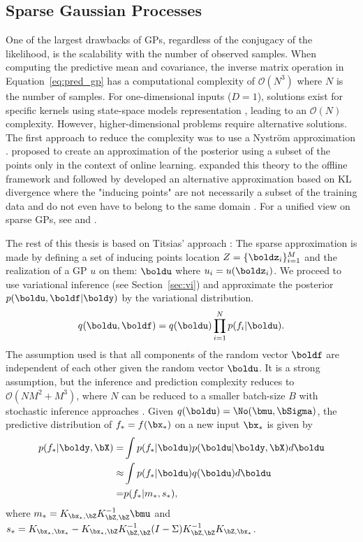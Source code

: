 \subsection{Sparse Gaussian Processes}
\label{sec:sparsegps}
One of the largest drawbacks of \ac{GPs}, regardless of the conjugacy of the likelihood, is the scalability with the number of observed samples.
When computing the predictive mean and covariance, the inverse matrix operation in Equation~\eqref{eq:pred_gp} has a computational complexity of $\mathcal{O}(N^3)$ where $N$ is the number of samples.
For one-dimensional inputs ($D=1$), solutions exist for specific kernels using state-space models representation \cite{pmlr-v9-turner10a,solinInfiniteHorizonGaussianProcesses2018}, leading to an $\mathcal{O}(N)$ complexity.
However, higher-dimensional problems require alternative solutions.
The first approach to reduce the complexity was to use a Nystr\"om approximation \cite{williams2002observations}.
\citet{csato2002sparse} proposed to create an approximation of the posterior using a subset of the points only in the context of online learning.
\citet{snelsonSparseGaussianProcesses2009} expanded this theory to the offline framework and \citet{csato2002gaussian} followed by \citet{Titsias2009} developed an alternative approximation based on KL divergence where the "inducing points" are not necessarily a subset of the training data and do not even have to belong to the same domain \cite{NIPS2009_5ea1649a, vdw2020framework}.
For a unified view on sparse \ac{GPs}, see \citet{quinonero2005unifying} and \citet{bui2017unifying}.

The rest of this thesis is based on Titsias' approach \cite{Titsias2009}:
The sparse approximation is made by defining a set of inducing points location $Z=\{\boldz_i\}_{i=1}^M$ and the realization of a \ac{GP} $u$ on them: $\boldu$ where $u_i = u(\boldz_i)$.
We proceed to use variational inference (see Section~\ref{sec:vi}) and approximate the posterior $p(\boldu,\boldf|\boldy)$ by the variational distribution.
\begin{align}
    q(\boldu,\boldf) = q(\boldu)\prod_{i=1}^N p(f_i|\boldu).
    \label{eq:titsias_assumption}
\end{align}
The assumption used is that all components of the random vector $\boldf$ are independent of each other given the random vector $\boldu$.
It is a strong assumption, but the inference and prediction complexity reduces to $\mathcal{O}(NM^2 + M^3)$, where $N$ can be reduced to a smaller batch-size $B$ with stochastic inference approaches \cite{Hensman2013, Hensman2015}.
Given $q(\boldu) = \No(\bmu,\bSigma)$, the predictive distribution of $f_*=f(\bx_*)$ on a new input $\bx_*$ is given by
\begin{align*}
    p(f_*|\boldy,\bX) =& \int p(f_*|\boldu) p(\boldu|\boldy,\bX)d\boldu\\
    \approx& \int p(f_*|\boldu) q(\boldu)d\boldu\\
    =& p(f_*|m_*,s_*),
\end{align*}
where $m_* = K_{\bx_*,\bZ} K^{-1}_{\bZ,\bZ} \bmu$ and $s_* = K_{\bx_*,\bx_*} - K_{\bx_*,\bZ}K_{\bZ,\bZ}^{-1}(I - \Sigma) K^{-1}_{\bZ,\bZ}K_{\bZ,\bx_*}$.

